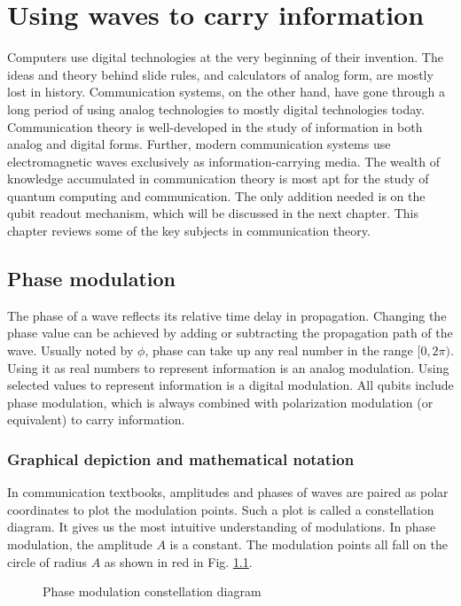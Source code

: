 \documentclass[oneside, letter, 12pt]{book}
\begin{document}
\chapter{Using waves to carry information}\label{c-modulation}
Computers use digital technologies at the very beginning of their invention. The ideas and theory behind slide rules, and calculators of analog form, are mostly lost in history. Communication systems, on the other hand, have gone through a long period of using analog technologies to mostly digital technologies today. Communication theory is well-developed in the study of information in both analog and digital forms. Further, modern communication systems use electromagnetic waves exclusively as information-carrying media. The wealth of knowledge accumulated in communication theory is most apt for the study of quantum computing and communication. The only addition needed is on the qubit readout mechanism, which will be discussed in the next chapter. This chapter reviews some of the key subjects in communication theory.

\section{Phase modulation}
The phase of a wave reflects its relative time delay in propagation. Changing the phase value can be achieved by adding or subtracting the propagation path of the wave. Usually noted by $\phi$, phase can take up any real number in the range $[0, 2 \pi)$. Using it as real numbers to represent information is an analog modulation. Using selected values to represent information is a digital modulation. All qubits include phase modulation, which is always combined with polarization modulation (or equivalent) to carry information.

\subsection{Graphical depiction and mathematical notation}
In communication textbooks, amplitudes and phases of waves are paired as polar coordinates to plot the modulation points. Such a plot is called a constellation diagram. It gives us the most intuitive understanding of modulations. In phase modulation, the amplitude $A$ is a constant. The modulation points all fall on the circle of radius $A$ as shown in red in Fig. \ref{PM}.

\begin{figure}[h]\label{PM}
\caption{Phase modulation constellation diagram}
\end{figure}
\end{document}
